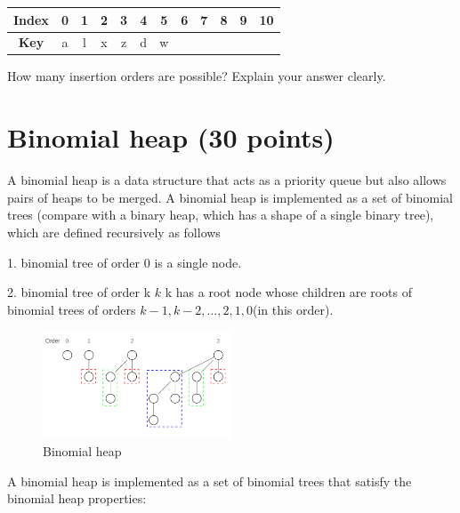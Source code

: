 \documentclass[11pt]{exam}
\begin{document}
\begin{table}[H]
    \centering
    \setlength{\tabcolsep}{5.5mm}
    \begin{tabular}{|c|c|c|c|c|c|c|c|c|c|c|c|}
        \hline
        \textbf{Index} & 0 & 1 & 2 & 3 & 4 & 5 & 6 & 7 & 8 & 9 & 10 \\
        \hline
        \textbf{Key}   & a & l & x & z & d & w &   &   &   &   &    \\
        \hline
    \end{tabular}
\end{table}
How many insertion orders are possible? Explain your answer clearly.

\begin{solution}
\end{solution}
\section{Binomial heap (30 points)}
A binomial heap is a data structure that acts as a priority queue but also allows pairs of heaps to be merged.
A binomial heap is implemented as a set of binomial trees (compare with a binary heap, which has a shape of a single binary tree), which are defined recursively as follows

1. binomial tree of order 0 is a single node.

2. binomial tree of order k ${\displaystyle k}$ k has a root node whose children are roots of binomial trees of orders $k - 1, k - 2 , ..., 2, 1, 0 $(in this order).

\begin{figure}[H]
    \begin{small}
        \begin{center}
            \includegraphics[width=0.5\textwidth]{./pic1.png}
        \end{center}
        \caption{Binomial heap}
    \end{small}
\end{figure}

A binomial heap is implemented as a set of binomial trees that satisfy the binomial heap properties:
\end{document}
